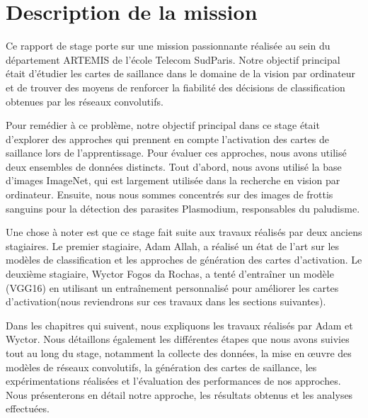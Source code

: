 \documentclass{report}
\begin{document}
{\section{Description de la mission }
\hspace{1.4cm}Ce rapport de stage porte sur une mission passionnante réalisée au sein du département ARTEMIS de l'école Telecom SudParis. Notre objectif principal était d'étudier les cartes de saillance dans le domaine de la vision par ordinateur et de trouver des moyens de renforcer la fiabilité des décisions de classification obtenues par les réseaux convolutifs.
\vspace*{0.5\baselineskip}

\hspace{1.6cm}Pour remédier à ce problème, notre objectif principal dans ce stage était d'explorer des approches qui prennent en compte l'activation des cartes de saillance lors de l'apprentissage. Pour évaluer ces approches, nous avons utilisé deux ensembles de données distincts. Tout d'abord, nous avons utilisé la base d'images ImageNet, qui est largement utilisée dans la recherche en vision par ordinateur. Ensuite, nous nous sommes concentrés sur des images de frottis sanguins pour la détection des parasites Plasmodium, responsables du paludisme.
\vspace*{0.5\baselineskip}

\hspace{1.6cm}Une chose à noter est que ce stage fait suite aux travaux réalisés par deux anciens stagiaires. Le premier stagiaire, Adam Allah, a réalisé un état de l'art sur les modèles de classification et les approches de génération des cartes d'activation\cite{Adam21}. Le deuxième stagiaire, Wyctor Fogos da Rochas, a tenté d'entraîner un modèle (VGG16\cite{simonyan2015deep}) en utilisant un entraînement personnalisé pour améliorer les cartes d'activation\cite{Wyctor22}(nous reviendrons sur ces travaux dans les sections suivantes).
\vspace*{0.5\baselineskip}

\hspace{1.6cm}Dans les chapitres qui suivent, nous expliquons les travaux réalisés par Adam et Wyctor. Nous détaillons également les différentes étapes que nous avons suivies tout au long du stage, notamment la collecte des données, la mise en œuvre des modèles de réseaux convolutifs, la génération des cartes de saillance, les expérimentations réalisées et l'évaluation des performances de nos approches. Nous présenterons en détail notre approche, les résultats obtenus et les analyses effectuées.

}
\end{document}
